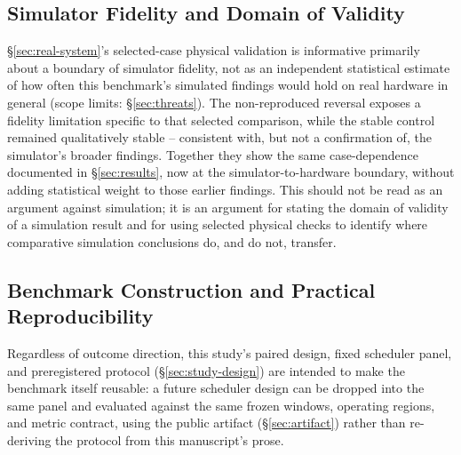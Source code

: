 \subsection{Simulator Fidelity and Domain of Validity}

\S\ref{sec:real-system}'s selected-case physical validation is informative
primarily about a boundary of simulator fidelity, not as an independent
statistical estimate of how often this benchmark's simulated findings
would hold on real hardware in general (scope limits:
\S\ref{sec:threats}). The non-reproduced reversal exposes a fidelity
limitation specific to that selected comparison, while the stable control
remained qualitatively stable -- consistent with, but not a confirmation
of, the simulator's broader findings. Together they show the same
case-dependence documented in \S\ref{sec:results}, now at the
simulator-to-hardware boundary, without adding statistical weight to those
earlier findings. This should not be read as an argument against simulation;
it is an argument for stating the domain of validity of a simulation result
and for using selected physical checks to identify where comparative
simulation conclusions do, and do not, transfer.

\subsection{Benchmark Construction and Practical Reproducibility}

Regardless of outcome direction, this study's paired design, fixed
scheduler panel, and preregistered protocol (\S\ref{sec:study-design})
are intended to make the benchmark itself reusable: a future scheduler
design can be dropped into the same panel and evaluated against the same
frozen windows, operating regions, and metric contract, using the public
artifact (\S\ref{sec:artifact}) rather than re-deriving the protocol
from this manuscript's prose.

